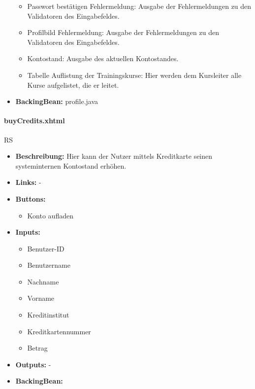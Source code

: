 \begin{itemize}
\begin{itemize}
								\item Passwort bestätigen Fehlermeldung: Ausgabe der Fehlermeldungen zu den Validatoren des Eingabefeldes.
								\item Profilbild Fehlermeldung: Ausgabe der Fehlermeldungen zu den Validatoren des Eingabefeldes.
								\item Kontostand: Ausgabe des aktuellen Kontostandes.
								\item Tabelle Auflistung der Trainingskurse: Hier werden dem Kursleiter alle Kurse aufgelistet, die er leitet.
							\end{itemize}
						\item \textbf{BackingBean:} profile.java
					\end{itemize}
				
				\paragraph{buyCredits.xhtml}
					RS\\
					\begin{itemize}
						\item \textbf{Beschreibung:} Hier kann der Nutzer mittels Kreditkarte seinen systeminternen Kontostand erhöhen.
						\item \textbf{Links:} -
						\item \textbf{Buttons:}
							\begin{itemize}
								\item Konto aufladen
							\end{itemize}
						\item \textbf{Inputs:}
							\begin{itemize}
								\item Benutzer-ID
								\item Benutzername
								\item Nachname
								\item Vorname
								\item Kreditinstitut
								\item Kreditkartennummer
								\item Betrag
							\end{itemize}
						\item \textbf{Outputs:} -
						\item \textbf{BackingBean:}
					\end{itemize}
				
